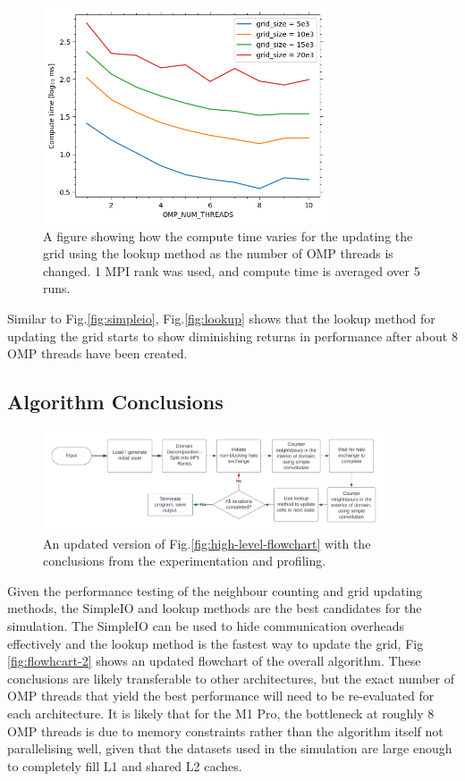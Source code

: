     \begin{figure}[htb]
    \centering
    \includegraphics[width=0.75\textwidth]{./figures/lookup}
    \caption{A figure showing how the compute time varies for the updating the grid using the lookup method as the number
        of OMP threads is changed.
        1 MPI rank was used, and compute time is averaged over 5 runs.}
    \label{fig:lookup}
    \end{figure}

    Similar to Fig.\eqref{fig:simpleio}, Fig.\eqref{fig:lookup} shows that the lookup method for updating the grid starts
    to show diminishing returns in performance after about 8 OMP threads have been created.

    \subsection{Algorithm Conclusions}\label{subsec:interim-conclusions}
    \begin{figure}[htb]
    \centering
    \includegraphics[width=0.9\textwidth]{./figures/flowchat-2}
    \caption{An updated version of Fig.\eqref{fig:high-level-flowchart} with the conclusions from the experimentation
    and profiling.}
    \label{fig:flowhcart-2}
    \end{figure}
    Given the performance testing of the neighbour counting and grid updating methods, the SimpleIO and lookup methods
    are the best candidates for the simulation.
    The SimpleIO can be used to hide communication overheads effectively and the lookup method is the fastest way to
    update the grid, Fig \eqref{fig:flowhcart-2} shows an updated flowchart of the overall algorithm.
    These conclusions are likely transferable to other architectures, but the exact number of OMP threads that yield
    the best performance will need to be re-evaluated for each architecture.
    It is likely that for the M1 Pro, the bottleneck at roughly 8 OMP threads is due to memory constraints rather
    than the algorithm itself not parallelising well, given that the datasets used in the simulation are large enough
    to completely fill L1 and shared L2 caches.

